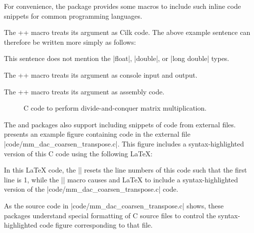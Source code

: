 \documentclass[10pt]{article}
\newcommand\latex[1]{\codevrb[latex]#1}
\newenvironment{latexcode}
{\VerbatimEnvironment%
\begin{inparcode}%
\begin{EssayLatex}}
{\end{EssayLatex}%
\end{inparcode}}
\begin{document}
For convenience, the  package provides some macros to
include such inline code snippets for common programming languages.
\begin{closeitemize}

\item The \latex+\cc+ macro treats its argument as Cilk code.  The
  above example sentence can therefore be written more simply as
  follows:
\begin{latexcode}
This sentence does not mention the \cc|float|, \cc|double|, or
\cc|long double| types.
\end{latexcode}

\item The \latex+\sh+ macro treats its argument as console input and
  output.

\item The \latex+\asm+ macro treats its argument as assembly code.

\end{closeitemize}

\begin{figure}[t]
  \resetLineNumbers
  \begin{flushleft}
  \end{flushleft}
  \caption{C code to perform divide-and-conquer matrix multiplication.}
\end{figure}

The  and  packages also support
including snippets of code from external files.
 presents an example figure
containing code in the external file
\sh|code/mm_dac_coarsen_transpose.c|.  This figure includes a
syntax-highlighted version of this C code using the following \LaTeX{}:
\begin{latexcode}
\resetLineNumbers
\begin{flushleft}
\end{flushleft}
\end{latexcode}
In this \LaTeX{} code, the \latex|\resetLineNumbers| resets the line
numbers of this code such that the first line is 1, while the
\latex|\codefig| macro causes  and \LaTeX{} to
include a syntax-highlighted version of the
\sh|code/mm_dac_coarsen_transpose.c| code.

As the source code in \sh|code/mm_dac_coarsen_transpose.c| shows,
these packages understand special formatting of C source files to
control the syntax-highlighted code figure corresponding to that file.
\end{document}

